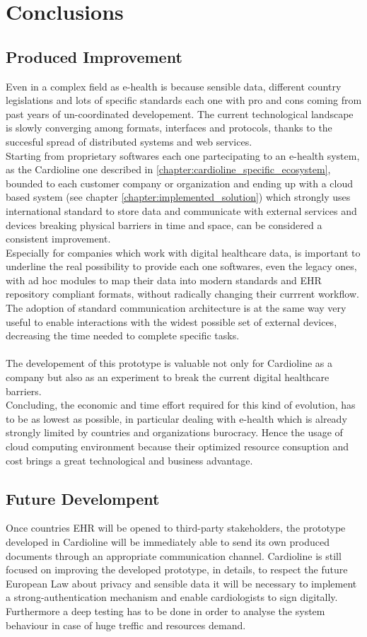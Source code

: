 \chapter{Conclusions}
\section{Produced Improvement}
Even in a complex field as e-health is because sensible data, different country legislations and lots of specific standards each one with pro and cons coming from past years of un-coordinated developement. The current technological landscape is slowly converging among formats, interfaces and protocols, thanks to the succesful spread of distributed systems and web services.\\
Starting from proprietary softwares each one partecipating to an e-health system, as the Cardioline one described in \ref{chapter:cardioline_specific_ecosystem}, bounded to each customer company or organization and ending up with a cloud based system (see chapter \ref{chapter:implemented_solution}) which strongly uses international standard to store data and communicate with external services and devices breaking physical barriers in time and space, can be considered a consistent improvement.\\
Especially for companies which work with digital healthcare data, is important to underline the real possibility to provide each one softwares, even the legacy ones, with ad hoc modules to map their data into modern standards and EHR repository compliant formats, without radically changing their currrent workflow.
The adoption of standard communication architecture is at the same way very useful to enable interactions with the widest possible set of external devices, decreasing the time needed to complete specific tasks.\\ \\
The developement of this prototype is valuable not only for Cardioline as a company but also as an experiment to break the current digital healthcare barriers.\\
Concluding, the economic and time effort required for this kind of evolution, has to be as lowest as possible, in particular dealing with e-health which is already strongly limited by countries and organizations burocracy. Hence the usage of cloud computing environment because their optimized resource consuption and cost brings a great technological and business advantage.

\section{Future Develompent}
Once countries EHR will be opened to third-party stakeholders, the prototype developed in Cardioline will be immediately able to send its own produced documents through an appropriate communication channel.
Cardioline is still focused on improving the developed prototype, in details, to respect the future European Law about privacy and sensible data it will be necessary to implement a strong-authentication mechanism and enable cardiologists to sign digitally.\\
Furthermore a deep testing has to be done in order to analyse the system behaviour in case of huge treffic and resources demand.